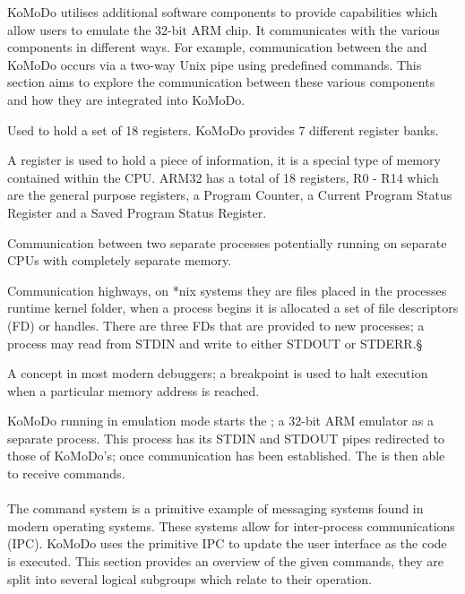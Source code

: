 KoMoDo utilises additional software components to provide capabilities which allow users to emulate the 32-bit ARM chip. It communicates with the various components in different ways. For example, communication between the  and KoMoDo occurs via a two-way Unix pipe using predefined commands. This section aims to explore the communication between these various components and how they are integrated into KoMoDo.

  \begin{description}[leftmargin=!,labelwidth=\widthof{\bfseries \footnotesize inter process communication}]
    \item[\footnotesize Register bank] Used to hold a set of 18 registers. KoMoDo provides 7 different register banks.
    \item[\footnotesize Register] A register is used to hold a piece of information, it is a special type of memory contained within the CPU. ARM32 has a total of 18 registers, R0 - R14 which are the general purpose registers, a Program Counter, a Current Program Status Register and a Saved Program Status Register.
    \item[\footnotesize Inter process communication] Communication between two separate processes potentially running on separate CPUs with completely separate memory.
    \item[\footnotesize (*nix) pipes] Communication highways, on *nix systems they are files placed in the processes runtime kernel folder, when a process begins it is allocated a set of file descriptors (FD) or handles. There are three FDs that are provided to new processes; a process may read from STDIN and write to  either STDOUT or STDERR.§
    \item[\footnotesize breakpoint] A concept in most modern debuggers; a breakpoint is used to halt execution when a particular memory address is reached.
  \end{description}
%
KoMoDo running in emulation mode starts the ; a 32-bit ARM emulator as a separate process. This process has its STDIN and STDOUT pipes redirected to those of KoMoDo's; once communication has been established. The  is then able to receive commands.\\\\
%
The command system is a primitive example of messaging systems found in modern operating systems. These systems allow for inter-process communications (IPC). KoMoDo uses the primitive IPC to update the user interface as the code is executed. This section provides an overview of the given commands, they are split into several logical subgroups which relate to their operation.
